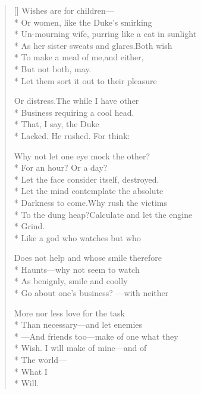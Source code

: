 \label{ch:lear_ay}
\settowidth{\versewidth}{To the dung heap?\qquad Calculate and let the engine}
\begin{verse}[\versewidth]
Wishes are for children---\\*
Or women, like the Duke's smirking\\*
Un-mourning wife, purring like a cat in sunlight\\*
As her sister sweats and glares.\qquad Both wish\\*
To make a meal of me,\qquad and either,\\*
But not both,  may.\\*
Let them sort it out to their pleasure

Or distress.\qquad The while I have other\\*
Business requiring a cool head.\\*
\qquad \qquad \qquad \qquad That, I say, the Duke\\*
Lacked.  He rushed. For think:

Why not let one eye mock the other?\\*
For an hour? Or a day?\\*
Let the face consider itself, destroyed.\\*
Let the mind contemplate the absolute\\*
Darkness to come.\qquad Why rush the victims\\*
To the dung heap?\qquad Calculate and let the engine\\*
Grind.\\*
\qquad Like a god who watches but who

Does not help and whose smile therefore\\*
Haunts---why not seem to watch\\*
As benignly, smile and coolly\\*
Go about one's business?  ---with neither

More nor less love for the task\\*
Than necessary---and let enemies\\*
---And friends too---make of one what they\\*
Wish.   I will make of mine---and of\\*
The world---\\*
What I\\*
Will.
\end{verse}
